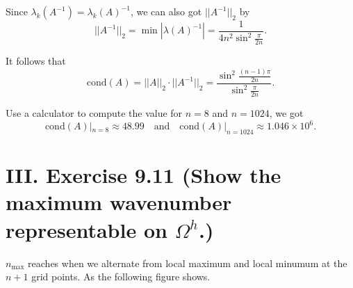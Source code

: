 \documentclass[twoside,a4paper]{article}
\begin{document}
Since $\lambda_k(A^{-1})=\lambda_k(A)^{-1}$, we can also got $||A^{-1}||_2$ by
\begin{equation*}
    ||A^{-1}||_2=\min|\lambda(A)^{-1}| = \frac{1}{4n^2\sin^2\frac{\pi}{2n}}.
\end{equation*}

It follows that
\begin{equation*}
    \text{cond}(A) = ||A||_2\cdot ||A^{-1}||_2=\frac{\sin^2\frac{(n-1)\pi}{2n}}{\sin^2\frac{\pi}{2n}}.
\end{equation*}

Use a calculator to compute the value for $n=8$ and $n=1024$, we got
\begin{equation*}
    \text{cond}(A)|_{n=8}\approx 48.99 \quad \text{and} \quad \text{cond}(A)|_{n=1024}\approx 1.046\times 10^6.
\end{equation*}

\section*{III. Exercise 9.11 (Show the maximum wavenumber representable on $\Omega^h$.)}

\;\;\;\;\;\;$n_\text{max}$ reaches when we alternate from local maximum and local minumum at the $n+1$ grid points. As the following figure shows.
\end{document}
